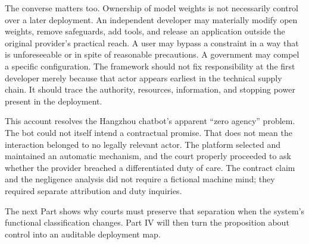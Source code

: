 The converse matters too. Ownership of model weights is not necessarily control over a later deployment. An independent developer may materially modify open weights, remove safeguards, add tools, and release an application outside the original provider's practical reach. A user may bypass a constraint in a way that is unforeseeable or in spite of reasonable precautions. A government may compel a specific configuration. The framework should not fix responsibility at the first developer merely because that actor appears earliest in the technical supply chain. It should trace the authority, resources, information, and stopping power present in the deployment.

This account resolves the Hangzhou chatbot's apparent ``zero agency'' problem. The bot could not itself intend a contractual promise. That does not mean the interaction belonged to no legally relevant actor. The platform selected and maintained an automatic mechanism, and the court properly proceeded to ask whether the provider breached a differentiated duty of care. The contract claim and the negligence analysis did not require a fictional machine mind; they required separate attribution and duty inquiries.

The next Part shows why courts must preserve that separation when the system's functional classification changes. Part IV will then turn the proposition about control into an auditable deployment map.
